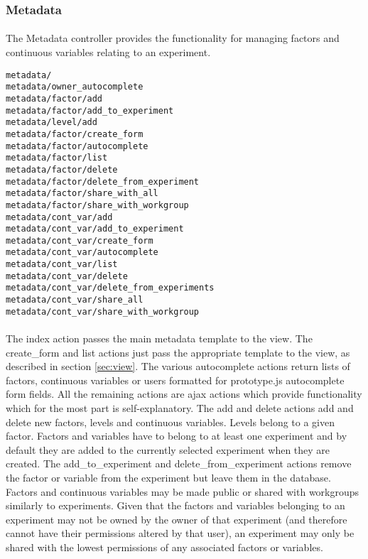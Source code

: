 \subsubsection{Metadata}
\label{sec:controller_metadata}

\paragraph{}
The Metadata controller provides the functionality for managing factors and continuous variables relating to an experiment. 

\begin{scriptsize}
\begin{verbatim}
metadata/ 
metadata/owner_autocomplete
metadata/factor/add
metadata/factor/add_to_experiment
metadata/level/add
metadata/factor/create_form
metadata/factor/autocomplete
metadata/factor/list
metadata/factor/delete
metadata/factor/delete_from_experiment
metadata/factor/share_with_all
metadata/factor/share_with_workgroup
metadata/cont_var/add
metadata/cont_var/add_to_experiment
metadata/cont_var/create_form
metadata/cont_var/autocomplete
metadata/cont_var/list
metadata/cont_var/delete
metadata/cont_var/delete_from_experiments
metadata/cont_var/share_all
metadata/cont_var/share_with_workgroup
\end{verbatim}
\end{scriptsize}

\paragraph{}
The index action passes the main metadata template to the view. The create\_form and list actions just pass the appropriate template to the view, as described in section \ref{sec:view}. The various autocomplete actions return lists of factors, continuous variables or users formatted for prototype.js autocomplete form fields. All the remaining actions are ajax actions which provide functionality which for the most part is self-explanatory. The add and delete actions add and delete new factors, levels and continuous variables. Levels belong to a given factor. Factors and variables have to belong to at least one experiment and by default they are added to the currently selected experiment when they are created. The add\_to\_experiment and delete\_from\_experiment actions remove the factor or variable from the experiment but leave them in the database. Factors and continuous variables may be made public or shared with workgroups similarly to experiments. Given that the factors and variables belonging to an experiment may not be owned by the owner of that experiment (and therefore cannot have their permissions altered by that user), an experiment may only be shared with the lowest permissions of any associated factors or variables. 
